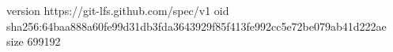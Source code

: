 version https://git-lfs.github.com/spec/v1
oid sha256:64baa888a60fe99d31db3fda3643929f85f413fe992cc5e72be079ab41d222ae
size 699192
